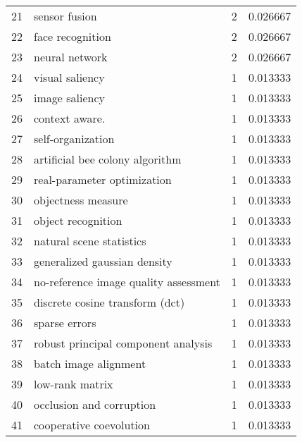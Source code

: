 \begin{tabular}{llrr}
21 &                                   sensor fusion &           2 &    0.026667 \\
22 &                                face recognition &           2 &    0.026667 \\
23 &                                  neural network &           2 &    0.026667 \\
24 &                                 visual saliency &           1 &    0.013333 \\
25 &                                  image saliency &           1 &    0.013333 \\
26 &                                  context aware. &           1 &    0.013333 \\
27 &                               self-organization &           1 &    0.013333 \\
28 &                 artificial bee colony algorithm &           1 &    0.013333 \\
29 &                     real-parameter optimization &           1 &    0.013333 \\
30 &                              objectness measure &           1 &    0.013333 \\
31 &                              object recognition &           1 &    0.013333 \\
32 &                        natural scene statistics &           1 &    0.013333 \\
33 &                    generalized gaussian density &           1 &    0.013333 \\
34 &           no-reference image quality assessment &           1 &    0.013333 \\
35 &                 discrete cosine transform (dct) &           1 &    0.013333 \\
36 &                                   sparse errors &           1 &    0.013333 \\
37 &             robust principal component analysis &           1 &    0.013333 \\
38 &                           batch image alignment &           1 &    0.013333 \\
39 &                                 low-rank matrix &           1 &    0.013333 \\
40 &                        occlusion and corruption &           1 &    0.013333 \\
41 &                         cooperative coevolution &           1 &    0.013333 \\

\end{tabular}
